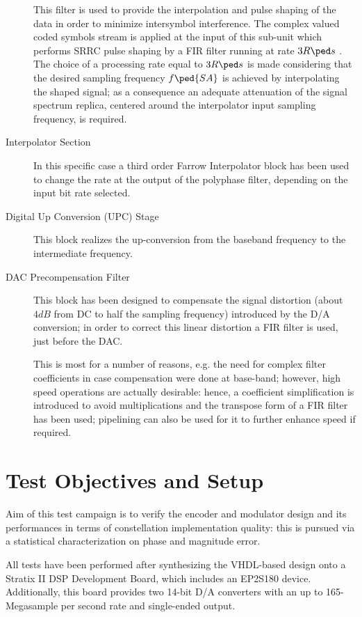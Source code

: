 \begin{description}
    This filter is used to provide the interpolation and pulse shaping of the data in order to minimize intersymbol interference. The complex valued coded symbols stream is applied at the input of this sub-unit which performs SRRC pulse shaping by a FIR filter running at rate \(3 R\ped s\) . The choice of a processing rate equal to \(3 R\ped s\) is made considering that the desired sampling frequency  \(f\ped{SA}\) is achieved by interpolating the shaped signal; as a consequence an adequate attenuation of the signal spectrum replica, centered around the interpolator input sampling frequency, is required.
\item[Interpolator Section] In this specific case a third order Farrow Interpolator block has been used to change the rate at the output of the polyphase filter, depending on the input bit rate selected.

\item[Digital Up Conversion (UPC) Stage] This block realizes the up-conversion from the baseband frequency to the intermediate frequency.

\item[DAC Precompensation Filter] This block has been designed to compensate the signal distortion (about \(4\unit{dB}\) from DC to half the sampling frequency) introduced by the D/A conversion; in order to correct this linear distortion a FIR filter is used, just before the DAC.

    This is most for a number of reasons, e.g. the need for complex filter coefficients in case compensation were done at base-band; however, high speed operations are actually desirable: hence, a coefficient simplification is introduced to avoid multiplications and the transpose form of a FIR filter has been used; pipelining can also be used for it to further enhance speed if required.

\end{description}

\clearpage

\section{Test Objectives and Setup}

Aim of this test campaign is to verify the encoder and modulator design and its performances in terms of constellation implementation quality: this is pursued via a statistical characterization on phase and magnitude error.

All tests have been performed after synthesizing the VHDL-based design onto a Stratix II DSP Development Board, which includes an EP2S180 device. Additionally, this board provides two 14-bit D/A converters with an up to 165-Megasample per second rate and single-ended output.

